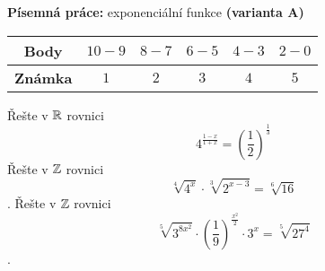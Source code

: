 \begin{center}
\large \textbf{Písemná práce:} exponenciální funkce \textbf{(varianta A)}

\normalsize
{}\qquad
{}\qquad
{}
\end{center}
\begin{table}[h]
\centering
\begin{tabular}{c|c|c|c|c|c}
    \textbf{Body}   & $10-9$ & $8-7$ & $6-5$ & $4-3$ & $2-0$ \\ \hline
    \textbf{Známka} & $1$     & $2$   & $3 $  & $4$   & $5$
\end{tabular}
\end{table}

\begin{questions}
    \question[3] Řešte v $\mathbb{R}$ rovnici $$4^{\frac{1-x}{1+x}}=\left(\frac{1}{2}\right)^{\frac{1}{3}}$$
    \question[3] Řešte v $\mathbb{Z}$ rovnici $$\sqrt[4]{4^x}\cdot \sqrt[3]{2^{x-3}}=\sqrt[6]{16}$$.
    \question[4] Řešte v $\mathbb{Z}$ rovnici $$\sqrt[5]{3^{8x^2}}\cdot\left(\frac{1}{9}\right)^{\frac{x^2}{2}}\cdot 3^x=\sqrt[5]{27^4}$$.
\end{questions}

\newpage

